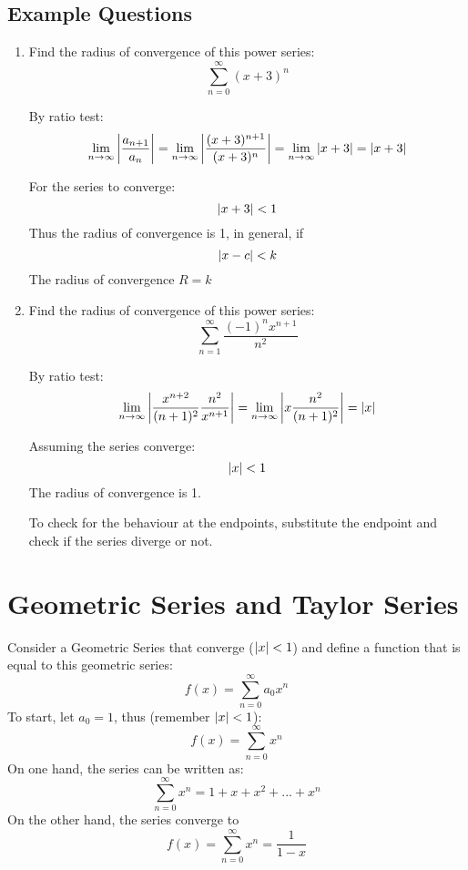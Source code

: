 \documentclass{article}
\numberwithin{equation}{section}
\begin{document}
\newpage
\subsection{Example Questions}
\begin{enumerate}
\item Find the radius of convergence of this power series:
\[
\sum_{n=0}^{\infty}(x+3)^n
\]

By ratio test:
\[
    \lim_{n\to \infty} \abs{\frac{a_{n+1}}{a_n}} = \lim_{n\to\infty} \abs{\frac{(x+3)^{n+1}}{(x+3)^n}} = \lim_{n\to\infty}\abs{x+3} = \abs{x+3}
\]

For the series to converge:
\[
\abs{x+3} < 1
\]
Thus the radius of convergence is 1, in general, if
\[
\abs{x-c} < k
\]
The radius of convergence $R = k$

\item Find the radius of convergence of this power series:
\[
\sum_{n=1}^{\infty}\frac{(-1)^n x^{n+1}}{n^2}
\]

By ratio test:
\[
\lim_{n\to \infty} \abs{\frac{x^{n+2}}{(n+1)^2} \frac{n^2}{x^{n+1}}} = \lim_{n\to \infty} \abs{x\frac{n^2}{(n+1)^2}} = \abs{x}
\]

Assuming the series converge:
\[
\abs{x} < 1
\]
The radius of convergence is 1.

To check for the behaviour at the endpoints, substitute the endpoint and check if the series diverge or not.
\end{enumerate}

\newpage
\section{Geometric Series and Taylor Series}
Consider a Geometric Series that converge ($\abs{x} < 1$) and define a function that is equal to this geometric series:
\[
    f(x) = \sum_{n=0}^{\infty} a_0 x^n
\]
To start, let $a_0 = 1$, thus (remember $\abs{x} < 1$):
\[
    f(x) = \sum_{n=0}^{\infty} x^n
\]
On one hand, the series can be written as:
\[
    \sum_{n=0}^{\infty} x^n = 1 + x + x^2 + ... + x^n
\]
On the other hand, the series converge to 
\[
    f(x) = \sum_{n=0}^{\infty} x^n = \frac{1}{1-x}
\]
\end{document}
